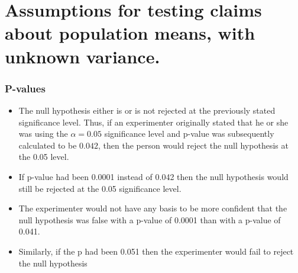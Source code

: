 ﻿\documentclass[a4]{beamer}
\begin{document}
\section{Assumptions for testing claims about population means, with unknown variance.}



\begin{frame}
\frametitle{P-values}
\large
\begin{itemize}
\item The null hypothesis either is or is not rejected at the previously stated significance level. Thus, if an experimenter originally stated that he or she was using the $\alpha = 0.05$ significance level and p-value was subsequently calculated to be $0.042$, then the person would reject the null hypothesis at the 0.05 level. \item If p-value had been 0.0001 instead of 0.042 then the null hypothesis would still be rejected at the 0.05 significance level.  \item 
The experimenter would not have any basis to be more confident that the null hypothesis was false with a p-value of 0.0001 than with a p-value of 0.041. \item Similarly, if the p had been 0.051 then the experimenter would fail to reject the null hypothesis
\end{itemize}

\end{frame}
\end{document}
